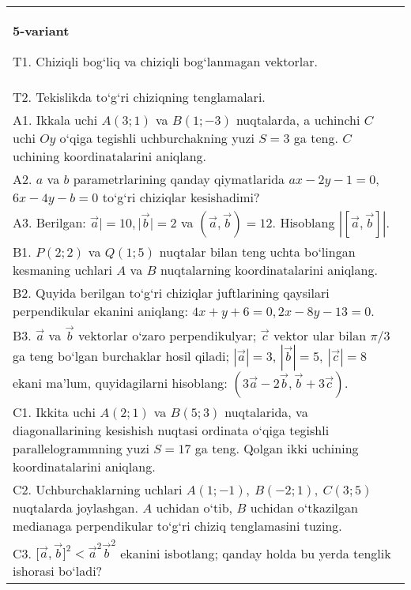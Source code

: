 \documentclass{article}
\begin{document}
\begin{tabular}{m{17cm}}
\textbf{5-variant}
\newline

T1. 
Chiziqli bog‘liq va chiziqli bog‘lanmagan vektorlar.
 \\
T2. 
Tekislikda to‘g‘ri chiziqning tenglamalari.
 \\
A1. 
Ikkala uchi $A (3;1) $ va $B (1;-3) $ nuqtalarda, a
uchinchi $C$ uchi $Oy$ o‘qiga tegishli uchburchakning
yuzi $S=3$ ga teng. $C$ uchining koordinatalarini aniqlang.
 \\
A2. 
$a$ va $b$ parametrlarining qanday qiymatlarida
$ax-2y-1=0$, $6x-4y-b=0$ to‘g‘ri chiziqlar kesishadimi?
 \\
A3. 
Berilgan: $\overrightarrow{a}| = 10,|\overrightarrow{b}| = 2$ va
$\left(\overrightarrow{a},\overrightarrow{b} \right) = 12$. Hisoblang
$\left| \left\lbrack \overrightarrow{a},\overrightarrow{b} \right\rbrack \right|$.
 \\
B1. 
\(P (2;2) \) va \(Q (1;5) \) nuqtalar bilan teng uchta
bo‘lingan kesmaning uchlari $A$ va $B$ nuqtalarning
koordinatalarini aniqlang.
 \\
B2. 
Quyida berilgan to‘g‘ri chiziqlar juftlarining qaysilari
perpendikular ekanini aniqlang: $4x+y+6=0, 2x-8y-13=0$.
 \\
B3. 
$\vec{a}$ va $\vec{b}$ vektorlar o‘zaro perpendikulyar; $\vec{c}$ vektor ular bilan $\pi/3$ ga teng bo‘lgan burchaklar hosil qiladi; $|\vec{a}| = 3$, $|\vec{b}| = 5,\ |\vec{c}| = 8$ ekani ma’lum, quyidagilarni hisoblang:
$\left(3\vec{a} - 2\vec{b},\vec{b} + 3\vec{c} \right) $.
 \\
C1. 
Ikkita uchi \(A (2;1) \) va \(B (5; 3) \) nuqtalarida, va
diagonallarining kesishish nuqtasi ordinata o‘qiga tegishli
parallelogrammning yuzi \(S = 17\) ga teng. Qolgan ikki uchining
koordinatalarini aniqlang. \\
C2. 
Uchburchaklarning uchlari
\(A (1; - 1),\ B (- 2;1),\ C (3;5) \) nuqtalarda joylashgan. $A$
uchidan o‘tib, $B$ uchidan o‘tkazilgan medianaga
perpendikular to‘g‘ri chiziq tenglamasini tuzing.
 \\
C3. 
\(\lbrack\vec{a},\vec{b}\rbrack^{2} < {\vec{a}}^{2}{\vec{b}}^{2}\) ekanini isbotlang; qanday holda bu yerda tenglik ishorasi bo‘ladi?
 \\

\end{tabular}
\vspace{1cm}
\end{document}
